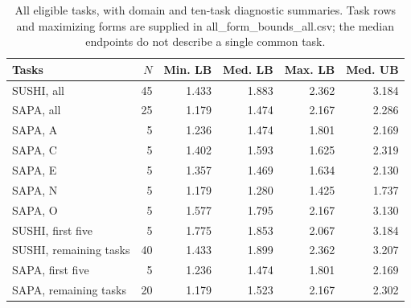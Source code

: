 \begin{table}[t]
\centering
\caption{All eligible tasks, with domain and ten-task diagnostic summaries. Task rows and maximizing forms are supplied in all\_form\_bounds\_all.csv; the median endpoints do not describe a single common task.}
\label{tab:allformdetail}
\small
\setlength{\tabcolsep}{4pt}
\begin{tabular}{lrrrrr}
\toprule
Tasks & $N$ & Min. LB & Med. LB & Max. LB & Med. UB \\
\midrule
SUSHI, all & 45 & 1.433 & 1.883 & 2.362 & 3.184 \\
SAPA, all & 25 & 1.179 & 1.474 & 2.167 & 2.286 \\
SAPA, A & 5 & 1.236 & 1.474 & 1.801 & 2.169 \\
SAPA, C & 5 & 1.402 & 1.593 & 1.625 & 2.319 \\
SAPA, E & 5 & 1.357 & 1.469 & 1.634 & 2.130 \\
SAPA, N & 5 & 1.179 & 1.280 & 1.425 & 1.737 \\
SAPA, O & 5 & 1.577 & 1.795 & 2.167 & 3.130 \\
SUSHI, first five & 5 & 1.775 & 1.853 & 2.067 & 3.184 \\
SUSHI, remaining tasks & 40 & 1.433 & 1.899 & 2.362 & 3.207 \\
SAPA, first five & 5 & 1.236 & 1.474 & 1.801 & 2.169 \\
SAPA, remaining tasks & 20 & 1.179 & 1.523 & 2.167 & 2.302 \\
\bottomrule
\end{tabular}
\end{table}
